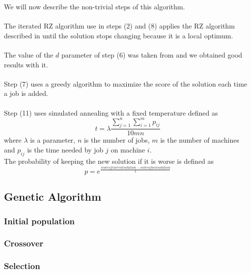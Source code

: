\documentclass[a4paper,10pt]{article}
\begin{document}
	We will now describe the non-trivial steps of this algorithm. \\

	\paragraph{} The iterated RZ algorithm use in steps (2) and (8) applies the RZ algorithm described in \cite{rajendran1997efficient} until the solution stops changing because it is a local optimum.

	\paragraph{} The value of the $d$ parameter of step (6) was taken from \cite{panruiz2012} and we obtained good results with it.

	\paragraph{} Step (7) uses a greedy algorithm to maximize the score of the solution each time a job is added.

	\paragraph{} Step (11) uses simulated annealing with a fixed temperature defined as
	$$ t = \lambda \frac{\sum_{j=1}^{n}\sum_{i=1}^{m}p_{ij}}{10mn} $$ where $\lambda$ is a parameter, $n$ is the number of jobs, $m$ is the number of machines and $p_{ij}$ is the time needed by job $j$ on machine $i$. \\
	The probability of keeping the new solution if it is worse is defined as 
	$$ p = e^{\frac{score of current solution - score of new solution}{t}}$$

	\subsection{Genetic Algorithm}

		\subsubsection{Initial population}

		\subsubsection{Crossover}

		\subsubsection{Selection}
\end{document}
